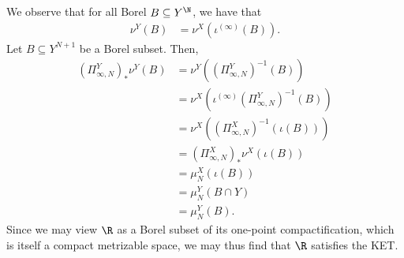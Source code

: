 \documentclass[10pt]{mypackage}
\begin{document}
\begin{solution}
  We observe that for all Borel $B\subseteq Y^{\N}$, we have that 
  \begin{align*}
    \nu^Y(B) &= \nu^X\left( \iota^{(\infty)}\left( B \right) \right).
  \end{align*}
  Let $B\subseteq Y^{N+1}$ be a Borel subset. Then,
  \begin{align*}
    \left( \Pi^Y_{\infty,N} \right)_{\ast}\nu^Y\left(B\right) &= \nu^Y\left( \left( \Pi^Y_{\infty,N} \right)^{-1}\left( B \right) \right)\\
                                                              &= \nu^X\left( \iota^{(\infty)}\left( \Pi^Y_{\infty,N} \right)^{-1}\left( B \right) \right)\\
                                                              &= \nu^X\left( \left( \Pi^{X}_{\infty,N} \right)^{-1}\left( \iota(B) \right) \right)\\
                                                              &= \left( \Pi^{X}_{\infty,N} \right)_{\ast}\nu^X\left( \iota(B) \right)\\
                                                              &= \mu^X_{N}\left( \iota(B) \right)\\
                                                              &= \mu^Y_N\left( B\cap Y \right)\\
                                                              &= \mu^Y_N\left( B \right).
  \end{align*}
  Since we may view $\R$ as a Borel subset of its one-point compactification, which is itself a compact metrizable space, we may thus find that $\R$ satisfies the KET.
\end{solution}
\end{document}
